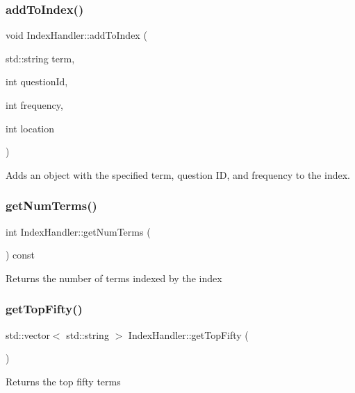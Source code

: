 \subsubsection{\texorpdfstring{add\+To\+Index()}{addToIndex()}}
{\footnotesize\ttfamily void Index\+Handler\+::add\+To\+Index (\begin{DoxyParamCaption}\item[{std\+::string}]{term,  }\item[{int}]{question\+Id,  }\item[{int}]{frequency,  }\item[{int}]{location }\end{DoxyParamCaption})}

Adds an object with the specified term, question ID, and frequency to the index. \mbox{\label{classIndexHandler_a2d1efa0d8e42f602f8fa4d51e4d25dfb}} 
\subsubsection{\texorpdfstring{get\+Num\+Terms()}{getNumTerms()}}
{\footnotesize\ttfamily int Index\+Handler\+::get\+Num\+Terms (\begin{DoxyParamCaption}{ }\end{DoxyParamCaption}) const}

Returns the number of terms indexed by the index \mbox{\label{classIndexHandler_a44cd905cd7699cbdc629dcd4ec934ec5}} 
\subsubsection{\texorpdfstring{get\+Top\+Fifty()}{getTopFifty()}}
{\footnotesize\ttfamily std\+::vector$<$ std\+::string $>$ Index\+Handler\+::get\+Top\+Fifty (\begin{DoxyParamCaption}{ }\end{DoxyParamCaption})}

Returns the top fifty terms \mbox{\label{classIndexHandler_a17ca15b3387355de1ad529c91c3f0667}} 
